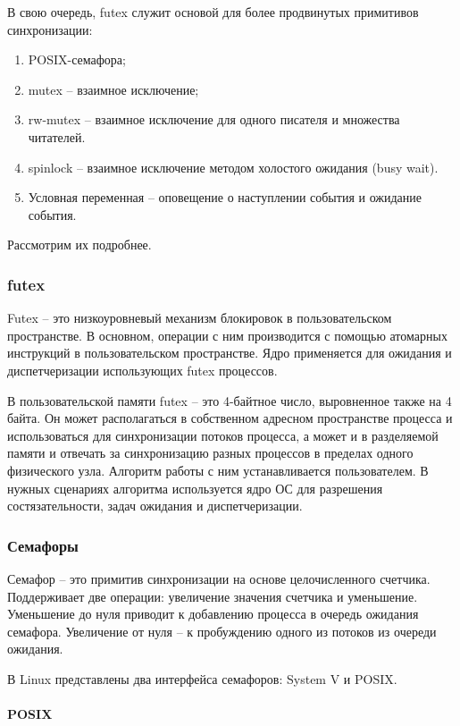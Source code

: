 В свою очередь, futex служит основой для более продвинутых примитивов синхронизации:
\begin{enumerate}
\item POSIX-семафора;
\item mutex -- взаимное исключение;
\item rw-mutex -- взаимное исключение для одного писателя и множества читателей.
\item spinlock -- взаимное исключение методом холостого ожидания (busy wait).
\item Условная переменная -- оповещение о наступлении события и ожидание события.
\end{enumerate}

Рассмотрим их подробнее.

\subsubsection{futex}

Futex \cite{FutexOrigins} -- это низкоуровневый механизм блокировок в пользовательском пространстве. В основном, операции с ним производится с помощью атомарных инструкций в пользовательском пространстве. Ядро применяется для ожидания и диспетчеризации использующих futex процессов.

В пользовательской памяти futex -- это 4-байтное число, выровненное также на 4 байта. Он может располагаться в собственном адресном пространстве процесса и использоваться для синхронизации потоков процесса, а может и в разделяемой памяти и отвечать за синхронизацию разных процессов в пределах одного физического узла. Алгоритм работы с ним устанавливается пользователем. В нужных сценариях алгоритма используется ядро ОС для разрешения состязательности, задач ожидания и диспетчеризации.

\subsubsection{Семафоры}

Семафор -- это примитив синхронизации на основе целочисленного счетчика. Поддерживает две операции: увеличение значения счетчика и уменьшение. Уменьшение до нуля приводит к добавлению процесса в очередь ожидания семафора. Увеличение от нуля -- к пробуждению одного из потоков из очереди ожидания.

В Linux представлены два интерфейса семафоров: System V и POSIX.

\paragraph{POSIX}

